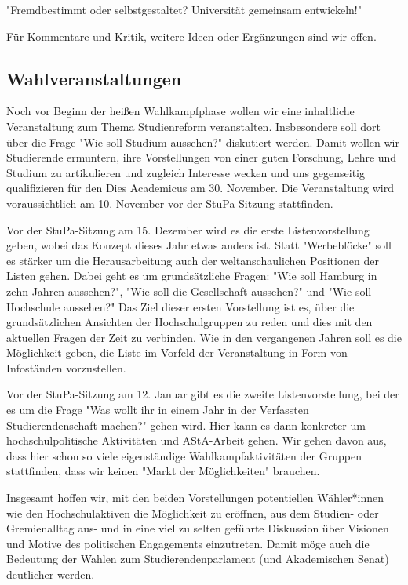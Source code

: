 \documentclass[ngerman,headheight=70pt]{scrartcl}
\begin{document}
    "Fremdbestimmt oder selbstgestaltet? Universität gemeinsam entwickeln!"

    Für Kommentare und Kritik, weitere Ideen oder Ergänzungen sind wir offen.

    \subsection{Wahlveranstaltungen}
    Noch vor Beginn der heißen Wahlkampfphase wollen wir eine inhaltliche
    Veranstaltung zum Thema Studienreform veranstalten. Insbesondere soll dort
    über die Frage "Wie soll Studium aussehen?" diskutiert werden. Damit wollen
    wir Studierende ermuntern, ihre Vorstellungen von einer guten Forschung,
    Lehre und Studium zu artikulieren und zugleich Interesse wecken und uns
    gegenseitig qualifizieren für den Dies Academicus am 30. November. Die
    Veranstaltung wird voraussichtlich am 10. November vor der StuPa-Sitzung
    stattfinden.

    Vor der StuPa-Sitzung am 15. Dezember wird es die erste Listenvorstellung
    geben, wobei das Konzept dieses Jahr etwas anders ist. Statt "Werbeblöcke"
    soll es stärker um die Herausarbeitung auch der weltanschaulichen Positionen
    der Listen gehen. Dabei geht es um grundsätzliche Fragen: "Wie soll Hamburg
    in zehn Jahren aussehen?", "Wie soll die Gesellschaft aussehen?" und "Wie
    soll Hochschule aussehen?" Das Ziel dieser ersten Vorstellung ist es, über
    die grundsätzlichen Ansichten der Hochschulgruppen zu reden und dies mit
    den aktuellen Fragen der Zeit zu verbinden.
    Wie in den vergangenen Jahren soll es die Möglichkeit geben, die Liste im
    Vorfeld der Veranstaltung in Form von Infoständen vorzustellen.

    Vor der StuPa-Sitzung am 12. Januar gibt es die zweite Listenvorstellung,
    bei der es um die Frage "Was wollt ihr in einem Jahr in der Verfassten
    Studierendenschaft machen?" gehen wird. Hier kann es dann konkreter um
     hochschulpolitische Aktivitäten und AStA-Arbeit gehen.
    Wir gehen davon aus, dass hier schon so viele eigenständige
    Wahlkampfaktivitäten der Gruppen stattfinden, dass wir keinen "Markt der
    Möglichkeiten" brauchen.

    Insgesamt hoffen wir, mit den beiden Vorstellungen potentiellen Wähler*innen
    wie den Hochschulaktiven die Möglichkeit zu eröffnen, aus dem Studien- oder
    Gremienalltag aus- und in eine viel zu selten geführte Diskussion über
    Visionen und Motive des politischen Engagements einzutreten. Damit möge auch
    die Bedeutung der Wahlen zum Studierendenparlament (und Akademischen Senat)
    deutlicher werden.
\end{document}
